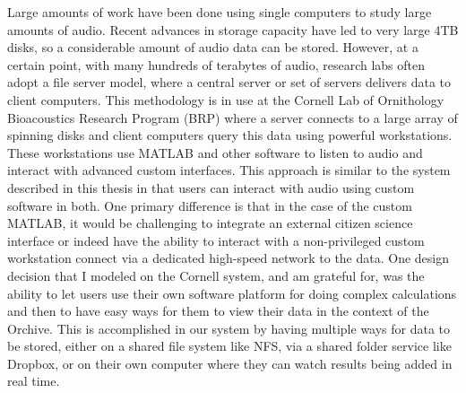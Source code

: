 Large amounts of work have been done using single computers to study
large amounts of audio.  Recent advances in storage capacity have led
to very large 4TB disks, so a considerable amount of audio data can be
stored.  However, at a certain point, with many hundreds of terabytes
of audio, research labs often adopt a file server model, where a
central server or set of servers delivers data to client computers.
This methodology is in use at the Cornell Lab of Ornithology
Bioacoustics Research Program (BRP) \cite{clark2012dcl} where a server
connects to a large array of spinning disks and client computers query
this data using powerful workstations.  These workstations use MATLAB
and other software to listen to audio and interact with advanced
custom interfaces.  This approach is similar to the system described
in this thesis in that users can interact with audio using custom
software in both.  One primary difference is that in the case of the
custom MATLAB, it would be challenging to integrate an external
citizen science interface or indeed have the ability to interact with
a non-privileged custom workstation connect via a dedicated high-speed
network to the data.  One design decision that I modeled on the
Cornell system, and am grateful for, was the ability to let users use
their own software platform for doing complex calculations and then
to have easy ways for them to view their data in the context of the
Orchive.  This is accomplished in our system by having multiple ways
for data to be stored, either on a shared file system like NFS, via a
shared folder service like Dropbox, or on their own computer where
they can watch results being added in real time.

